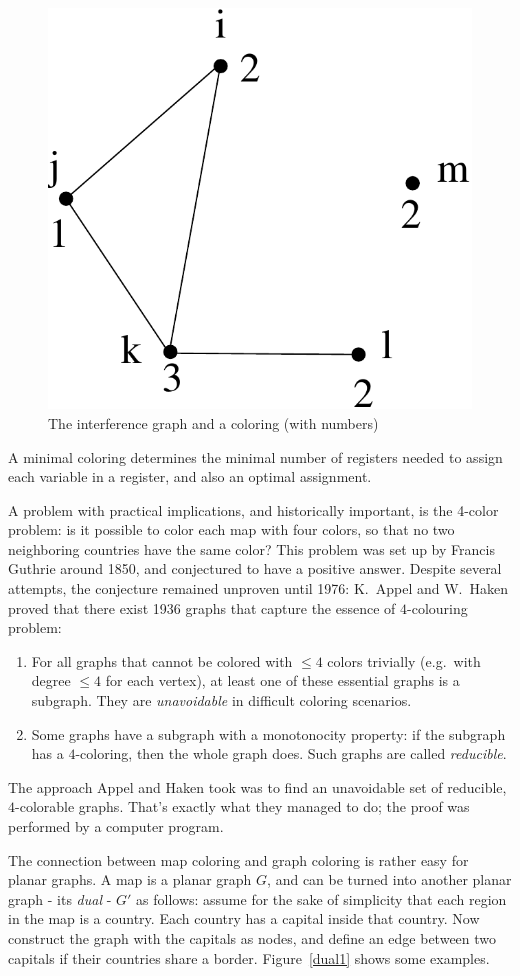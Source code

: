 \begin{itemize}
\begin{figure}[ht]
	\centering
	\includegraphics[width=0.2\linewidth,keepaspectratio]{regalloc1}
	\caption{The interference graph and a coloring (with numbers) \label{regalloc1}}
\end{figure}

A minimal coloring determines the minimal number of registers needed
to assign each variable in a register, and also an optimal assignment.

\end{itemize}

A problem with practical implications, and historically important, is
the 4-color problem: is it possible to color each map with four
colors, so that no two neighboring countries have the same color? This
problem was set up by Francis Guthrie around 1850, and conjectured to
have a positive answer. Despite several attempts, the conjecture
remained unproven until 1976: K.\ Appel and W.\ Haken proved that there
exist 1936 graphs that capture the essence of $4$-colouring problem:
\begin{enumerate}
	\item For all graphs that cannot be colored with $\leq 4$ colors trivially (e.g.\ with degree $\leq 4$ for each vertex), at least one of these essential graphs is a subgraph. They are \emph{unavoidable} in difficult coloring scenarios.
	\item Some graphs have a subgraph with a monotonocity property: if the subgraph has a $4$-coloring, then the whole graph does. Such graphs are called \emph{reducible}.
\end{enumerate}
The approach Appel and Haken took was to find an unavoidable set of reducible, $4$-colorable graphs. That's exactly what they managed to do; the proof was performed by a computer program.

The connection between map coloring and graph coloring is rather easy
for planar graphs. A map is a planar graph $G$, and can be turned into
another planar graph - its {\em dual} - $G'$ as follows: assume for
the sake of simplicity that each region in the map is a country. Each
country has a capital inside that country. Now construct the graph
with the capitals as nodes, and define an edge between two capitals if
their countries share a border. Figure~\ref{dual1} shows some
examples.

